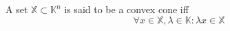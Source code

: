 A set $\mathbb{X} \subset \mathbb{K}^n$ is said to be a convex cone iff
$$\forall x \in \mathbb{X}, \lambda \in \mathbb{K} : \lambda x \in \mathbb{X}$$
